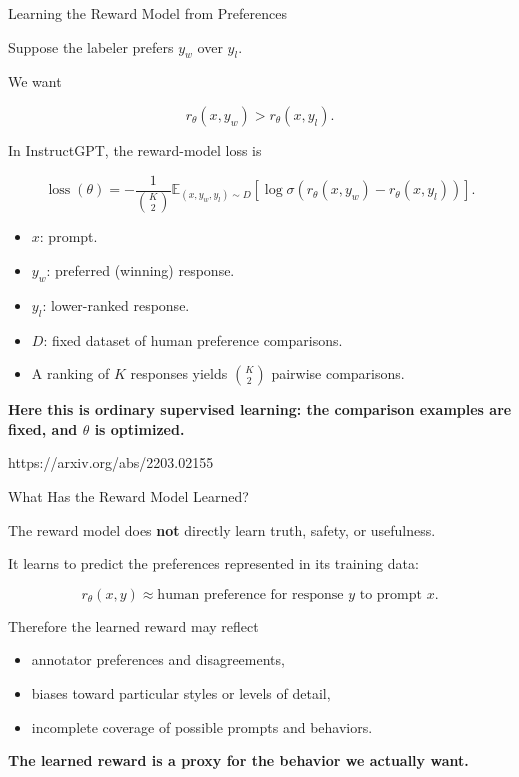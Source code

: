 \documentclass[11pt,compress,t,notes=noshow, xcolor=table]{beamer}
\begin{document}
\begin{vbframe}{Learning the Reward Model from Preferences}

Suppose the labeler prefers $y_w$ over $y_l$.

We want

\[
r_\theta(x,y_w) > r_\theta(x,y_l).
\]

In InstructGPT, the reward-model loss is

\[
\operatorname{loss}(\theta)
=
-\frac{1}{{K \choose 2}}
\mathbb{E}_{(x,y_w,y_l)\sim D}
\left[
\log
\sigma
\left(
r_\theta(x,y_w)-r_\theta(x,y_l)
\right)
\right].
\]

\begin{itemize}
    \item $x$: prompt.
    \item $y_w$: preferred (winning) response.
    \item $y_l$: lower-ranked response.
    \item $D$: fixed dataset of human preference comparisons.
    \item A ranking of $K$ responses yields ${K \choose 2}$ pairwise comparisons.

\end{itemize}

\begin{center}
\textbf{Here this is ordinary supervised learning:
the comparison examples are fixed, and $\theta$ is optimized.}
\end{center}

{https://arxiv.org/abs/2203.02155}

\end{vbframe}



\begin{vbframe}{What Has the Reward Model Learned?}

The reward model does \textbf{not} directly learn truth,
safety, or usefulness.

It learns to predict the preferences represented in its training data:

\[
r_\theta(x,y)
\approx
\text{human preference for response $y$ to prompt $x$}.
\]

Therefore the learned reward may reflect

\begin{itemize}
    \item annotator preferences and disagreements,
    \item biases toward particular styles or levels of detail,
    \item incomplete coverage of possible prompts and behaviors.
\end{itemize}

\begin{center}
\textbf{The learned reward is a proxy for the behavior we actually want.}
\end{center}

\end{vbframe}
\end{document}
